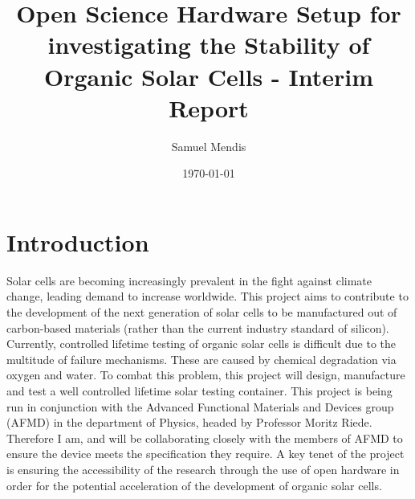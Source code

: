 \documentclass[a4paper,11pt]{article}
\begin{document}
\title{Open Science Hardware Setup for investigating the Stability of Organic Solar Cells - Interim Report}
\author{Samuel Mendis}
\date{\today}
\maketitle
\pagebreak
\section{Introduction}
Solar cells are becoming increasingly prevalent in the fight against climate change\cite[p.~34]{RN49}, leading demand to increase worldwide. This project aims to contribute to the development of the next generation of solar cells to be manufactured out of carbon-based materials (rather than the current industry standard of silicon). Currently, controlled lifetime testing of organic solar cells is difficult due to the multitude of failure mechanisms. These are caused by chemical degradation via oxygen and water\cite[p.~689]{RN38}. To combat this problem, this project will design, manufacture and test a well controlled lifetime solar testing container. This project is being run in conjunction with the Advanced Functional Materials and Devices group (AFMD) in the department of Physics, headed by Professor Moritz Riede. Therefore I am, and will be collaborating closely with the members of AFMD to ensure the device meets the specification they require. A key tenet of the project is ensuring the accessibility of the research through the use of open hardware in order for the  potential acceleration of the development of organic solar cells.
\end{document}
